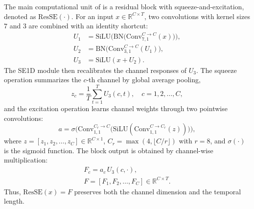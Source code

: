 The main computational unit of \HSL{} is a residual block with squeeze-and-excitation, denoted as $\mathrm{ResSE}(\cdot)$. For an input $x \in \mathbb{R}^{C \times T}$, two convolutions with kernel sizes $7$ and $3$ are combined with an identity shortcut:
\begin{align}
U_1 &= \mathrm{SiLU}\Big(\mathrm{BN}\big(\mathrm{Conv}_{7,1}^{C \to C}(x)\big)\Big), \\
U_2 &= \mathrm{BN}\big(\mathrm{Conv}_{3,1}^{C \to C}(U_1)\big), \\
U_3 &= \mathrm{SiLU}(x + U_2).
\end{align}
The SE1D module then recalibrates the channel responses of $U_3$. The squeeze operation summarizes the $c$-th channel by global average pooling,
\begin{equation}
z_c = \frac{1}{T}\sum_{t=1}^{T} U_3(c,t), \quad c = 1, 2, \dots, C,
\end{equation}
and the excitation operation learns channel weights through two pointwise convolutions:
\begin{equation}
a = \sigma\Big(\mathrm{Conv}_{1,1}^{C_r \to C}\big(\mathrm{SiLU}(\mathrm{Conv}_{1,1}^{C \to C_r}(z))\big)\Big),
\end{equation}
where $z = [z_1, z_2, \dots, z_C] \in \mathbb{R}^{C \times 1}$, $C_r = \max(4, \lfloor C/r \rfloor)$ with $r = 8$, and $\sigma(\cdot)$ is the sigmoid function. The block output is obtained by channel-wise multiplication:
\begin{equation}
\begin{gathered}
F_c = a_c\, U_3(c,\cdot), \\
F = [F_1, F_2, \dots, F_C] \in \mathbb{R}^{C \times T}.
\end{gathered}
\end{equation}
Thus, $\mathrm{ResSE}(x) = F$ preserves both the channel dimension and the temporal length.

